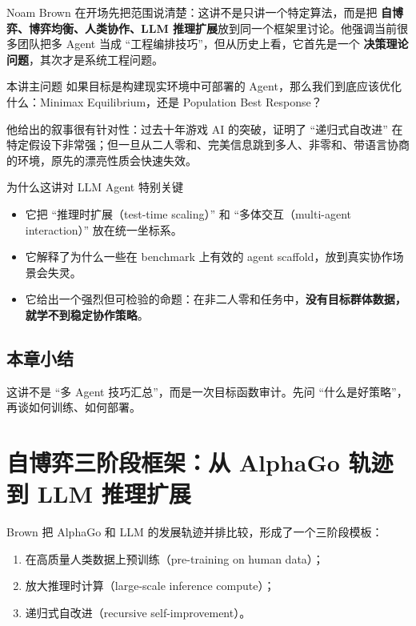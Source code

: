 \documentclass[a4paper]{article}
\begin{document}
Noam Brown 在开场先把范围说清楚：这讲不是只讲一个特定算法，而是把 \textbf{自博弈、博弈均衡、人类协作、LLM 推理扩展}放到同一个框架里讨论。他强调当前很多团队把多 Agent 当成 ``工程编排技巧''，但从历史上看，它首先是一个 \textbf{决策理论问题}，其次才是系统工程问题。

\begin{importantbox}{本讲主问题}
如果目标是构建现实环境中可部署的 Agent，那么我们到底应该优化什么：Minimax Equilibrium，还是 Population Best Response？
\end{importantbox}

他给出的叙事很有针对性：过去十年游戏 AI 的突破，证明了 ``递归式自改进'' 在特定假设下非常强；但一旦从二人零和、完美信息跳到多人、非零和、带语言协商的环境，原先的漂亮性质会快速失效。

\begin{knowledgebox}{为什么这讲对 LLM Agent 特别关键}
\begin{itemize}
    \item 它把 ``推理时扩展（test-time scaling）'' 和 ``多体交互（multi-agent interaction）'' 放在统一坐标系。
    \item 它解释了为什么一些在 benchmark 上有效的 agent scaffold，放到真实协作场景会失灵。
    \item 它给出一个强烈但可检验的命题：在非二人零和任务中，\textbf{没有目标群体数据，就学不到稳定协作策略}。
\end{itemize}
\end{knowledgebox}

\subsection{本章小结}
这讲不是 ``多 Agent 技巧汇总''，而是一次目标函数审计。先问 ``什么是好策略''，再谈如何训练、如何部署。

\section{自博弈三阶段框架：从 AlphaGo 轨迹到 LLM 推理扩展}

Brown 把 AlphaGo 和 LLM 的发展轨迹并排比较，形成了一个三阶段模板：
\begin{enumerate}
    \item 在高质量人类数据上预训练（pre-training on human data）；
    \item 放大推理时计算（large-scale inference compute）；
    \item 递归式自改进（recursive self-improvement）。
\end{enumerate}
\end{document}
